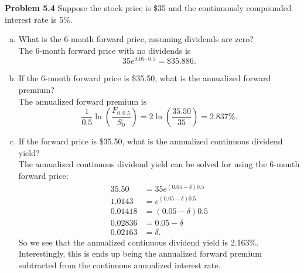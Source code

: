 \documentclass[12pt]{article}
\newcommand{\problem}[1]{\bigskip \noindent \textbf{Problem #1}}
\theoremstyle{plain}
\begin{document}
\problem{5.4} Suppose the stock price is \$35 and the continuously compounded interest rate is 5\%.

\begin{enumerate}[(a)]
\item What is the 6-month forward price, assuming dividends are zero?\\

The 6-month forward price with no dividends is
\[
35e^{0.05\cdot 0.5} = \$35.886.
\]

\item If the 6-month forward price is \$35.50, what is the annualized forward premium?\\

The annualized forward premium is
\[
\frac{1}{0.5} \ln\left(\frac{F_{0,0.5}}{S_0}\right) = 2\ln\left(\frac{35.50}{35}\right) = 2.837\%.
\]

\item If the forward price is \$35.50, what is the annualized continuous dividend yield?\\

The annualized continuous dividend yield can be solved for using the 6-month forward price:
\begin{align*}
35.50 &= 35 e^{(0.05 - \delta)0.5}\\
1.0143 &= e^{(0.05 - \delta)0.5}\\
0.01418 &= (0.05 - \delta)0.5\\
0.02836 &= 0.05 - \delta\\
0.02163 &= \delta.
\end{align*}
So we see that the annualized continuous dividend yield is 2.163\%. Interestingly, this is ends up being the annualized forward premium subtracted from the continuous annualized interest rate.
\end{enumerate}
\end{document}
